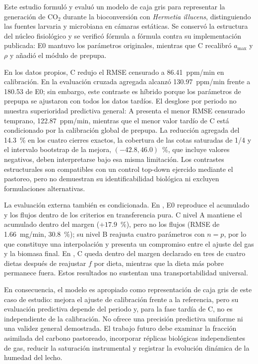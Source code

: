 
Este estudio formuló y evaluó un modelo de caja gris para representar la generación de CO$_2$ durante la bioconversión con \textit{Hermetia illucens}, distinguiendo las fuentes larvaria y microbiana en cámaras estáticas. Se conservó la estructura del núcleo fisiológico y se verificó fórmula a fórmula contra su implementación publicada: E0 mantuvo los parámetros originales, mientras que C recalibró $a_{\max}$ y $\rho$ y añadió el módulo de prepupa.

En los datos propios, C redujo el RMSE censurado a 86.41~ppm/min en calibración. En la evaluación cruzada agregada alcanzó 130.97~ppm/min frente a 180.53 de E0; sin embargo, este contraste es híbrido porque los parámetros de prepupa se ajustaron con todos los datos tardíos. El desglose por periodo no muestra superioridad predictiva general: A presenta el menor RMSE censurado temprano, 122.87~ppm/min, mientras que el menor valor tardío de C está condicionado por la calibración global de prepupa. La reducción agregada del 14.3~\% en los cuatro cierres exactos, la cobertura de las cotas saturadas de 1/4 y el intervalo bootstrap de la mejora, $(-42.8,46.0)$~\%, que incluye valores negativos, deben interpretarse bajo esa misma limitación. Los contrastes estructurales son compatibles con un control top-down ejercido mediante el pastoreo, pero no demuestran su identificabilidad biológica ni excluyen formulaciones alternativas.

La evaluación externa también es condicionada. En \textcite{ermolaevGreenhouseGasEmissions2019}, E0 reproduce el acumulado y los flujos dentro de los criterios en transferencia pura. C nivel A mantiene el acumulado dentro del margen ($+17.9$~\%), pero no los flujos (RMSE de 1.66~mg/min, 30.8~\%); su nivel B reajusta cuatro parámetros con $n=p$, por lo que constituye una interpolación y presenta un compromiso entre el ajuste del gas y la biomasa final. En \textcite{schonUsingGasExchange2026}, C queda dentro del margen declarado en tres de cuatro dietas después de reajustar $f$ por dieta, mientras que la dieta más pobre permanece fuera. Estos resultados no sustentan una transportabilidad universal.

En consecuencia, el modelo es apropiado como representación de caja gris de este caso de estudio: mejora el ajuste de calibración frente a la referencia, pero su evaluación predictiva depende del periodo y, para la fase tardía de C, no es independiente de la calibración. No ofrece una precisión predictiva uniforme ni una validez general demostrada. El trabajo futuro debe examinar la fracción asimilada del carbono pastoreado, incorporar réplicas biológicas independientes de gas, reducir la saturación instrumental y registrar la evolución dinámica de la humedad del lecho.
